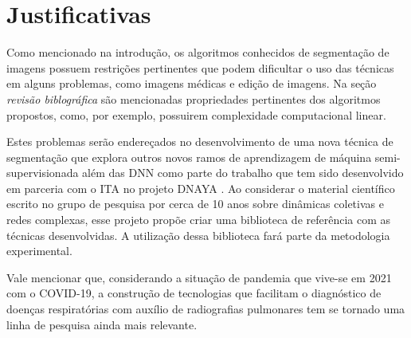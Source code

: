 \chapter{Justificativas}\label{cap:justificativas}

Como mencionado na introdução, os algoritmos conhecidos de segmentação
de imagens possuem restrições pertinentes que podem dificultar o uso
das técnicas em alguns problemas, como imagens médicas e edição de
imagens. Na seção \textit{revisão biblográfica} são mencionadas propriedades
pertinentes dos algoritmos propostos, como, por exemplo, possuirem complexidade
computacional linear.

Estes problemas serão endereçados no desenvolvimento de uma nova
técnica de segmentação que explora outros novos ramos de aprendizagem
de máquina semi-supervisionada além das \gls{DNN} como parte do
trabalho que tem sido desenvolvido em parceria com o \gls{ITA} no
projeto DNAYA \cite{DnayaMotivation}. Ao considerar o material
científico escrito no grupo de pesquisa por cerca de 10 anos sobre
dinâmicas coletivas e redes complexas, esse projeto propõe criar uma
biblioteca de referência com as técnicas desenvolvidas. A utilização
dessa biblioteca fará parte da metodologia experimental.

Vale mencionar que, considerando a situação de pandemia que vive-se em
2021 com o COVID-19, a construção de tecnologias que facilitam o
diagnóstico de doenças respiratórias com auxílio de radiografias
pulmonares tem se tornado uma linha de pesquisa ainda mais relevante.

